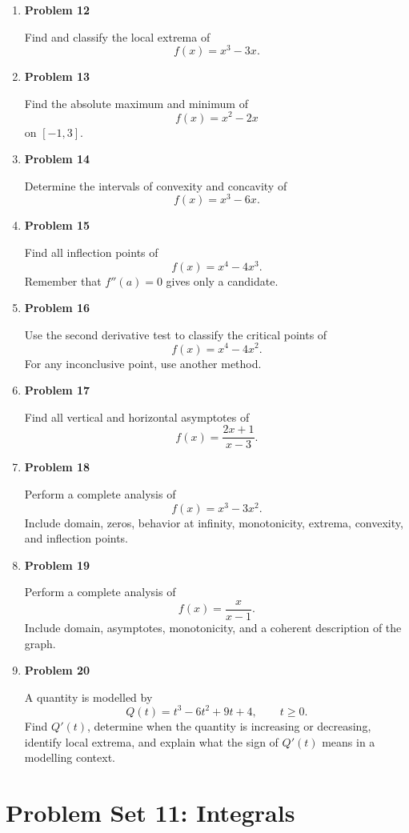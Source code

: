 \begin{enumerate}
\item \textbf{Problem 12}\par
Find and classify the local extrema of
\[
f(x)=x^3-3x.
\]

\item \textbf{Problem 13}\par
Find the absolute maximum and minimum of
\[
f(x)=x^2-2x
\]
on \([-1,3]\).

\item \textbf{Problem 14}\par
Determine the intervals of convexity and concavity of
\[
f(x)=x^3-6x.
\]

\item \textbf{Problem 15}\par
Find all inflection points of
\[
f(x)=x^4-4x^3.
\]
Remember that \(f''(a)=0\) gives only a candidate.

\item \textbf{Problem 16}\par
Use the second derivative test to classify the critical points of
\[
f(x)=x^4-4x^2.
\]
For any inconclusive point, use another method.

\item \textbf{Problem 17}\par
Find all vertical and horizontal asymptotes of
\[
f(x)=\frac{2x+1}{x-3}.
\]

\item \textbf{Problem 18}\par
Perform a complete analysis of
\[
f(x)=x^3-3x^2.
\]
Include domain, zeros, behavior at infinity, monotonicity, extrema, convexity, and inflection points.

\item \textbf{Problem 19}\par
Perform a complete analysis of
\[
f(x)=\frac{x}{x-1}.
\]
Include domain, asymptotes, monotonicity, and a coherent description of the graph.

\item \textbf{Problem 20}\par
A quantity is modelled by
\[
Q(t)=t^3-6t^2+9t+4,\qquad t\ge0.
\]
Find \(Q'(t)\), determine when the quantity is increasing or decreasing, identify local extrema, and explain what the sign of \(Q'(t)\) means in a modelling context.
\end{enumerate}

\section{Problem Set 11: Integrals}

